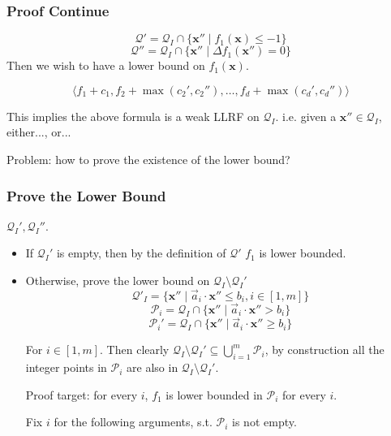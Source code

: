 \documentclass[11pt]{beamer}
\begin{document}
\begin{frame}\frametitle{Proof Continue}


\[\mathcal{Q}' = \mathcal{Q}_I\cap \{\textbf{x}''\mid f_1(\textbf{x}) \le -1\}\]
\[\mathcal{Q}'' = \mathcal{Q}_I \cap \{\textbf{x}''\mid \Delta f_1(\textbf{x}'') = 0\}\]
Then we wish to have a lower bound on $f_1(\textbf{x})$.

\[\langle f_1 + c_1, f_2 + \max(c_2', c_2''), \ldots, f_d + \max(c_d', c_d'')\rangle\]

This implies the above formula is a weak LLRF on $\mathcal{Q}_I$. i.e. given a $\textbf{x}''\in \mathcal{Q}_I$, either..., or...

Problem: how to prove the existence of the lower bound?

\end{frame}


\begin{frame}\frametitle{Prove the Lower Bound}
$\mathcal{Q}_I', \mathcal{Q}_I''$.
\begin{itemize}
\item If $\mathcal{Q}_I'$ is empty, then by the definition of $\mathcal{Q}'$ $f_1$ is lower bounded.

\item Otherwise, prove the lower bound on $\mathcal{Q}_I \setminus \mathcal{Q}_I'$
\[\mathcal{Q}'_I = \{\textbf{x}'' \mid \vec{a}_i\cdot \textbf{x}'' \le b_i, i \in [1, m]\}\]
\[\mathcal{P}_i = \mathcal{Q}_I \cap \{\textbf{x}''\mid \vec{a}_i \cdot \textbf{x}'' > b_i\}\]
\[\mathcal{P}_i' = \mathcal{Q}_I \cap \{\textbf{x}''\mid \vec{a}_i \cdot \textbf{x}'' \ge b_i\}\]

For $i\in [1, m]$.
Then clearly $\mathcal{Q}_I\setminus \mathcal{Q}_I' \subseteq \bigcup_{i = 1}^{m} \mathcal{P}_i$, by construction all the integer points in $\mathcal{P}_i$ are also in $\mathcal{Q}_I\setminus \mathcal{Q}_I'$.

Proof target: for every $i$, $f_1$ is lower bounded in $\mathcal{P}_i$ for every $i$.

Fix $i$ for the following arguments, s.t. $\mathcal{P}_i$ is not empty.



\end{itemize}


\end{frame}
\end{document}
